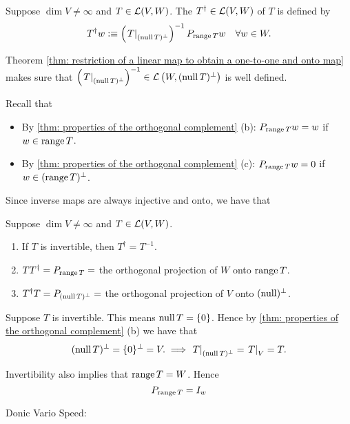 \begin{mydef}
  Suppose $\dim V \neq \infty$ and $T \in \mathcal{L}(V,W)$. The  $T^\dagger \in \mathcal{L}(V, W)$ of $T$ is defined by
  \[
    T^\dagger w :\equiv  \left( \left. T \right|_{(\operatorname{null} T)^\bot} \right)^{-1} P_{\operatorname{range} T} w \quad \forall w \in W.
  \]

  Theorem \ref{thm: restriction of a linear map to obtain a one-to-one and onto map} makes sure that $\left( \left. T \right|_{(\operatorname{null} T)^\bot} \right)^{-1} \in \mathcal{L} \left(W, (\operatorname{null} T)^\bot \right)$ is well defined.
\end{mydef}

Recall that
\begin{itemize}
  \item By \ref{thm: properties of the orthogonal complement} (b): $P_{\operatorname{range} T} w = w$ if $w \in \operatorname{range} T$.
  \item By \ref{thm: properties of the orthogonal complement} (c): $P_{\operatorname{range} T} w =0$ if $w \in (\operatorname{range} T)^\bot$.
\end{itemize}

Since inverse maps are always injective and onto, we have that

\begin{thm} 
  Suppose $\dim V \neq \infty$ and $T\in \mathcal{L}(V,W)$.
  \begin{enumerate}[label=(\alph*)]
    \item If $T$ is invertible, then $T^\dagger = T^{-1}$.
    \item $T T^\dagger = P_{\operatorname{range} T} =$ the orthogonal projection of $W$ onto $\operatorname{range} T$.
    \item $T^\dagger T = P_{(\operatorname{null} T)^\bot} =$ the orthogonal projection of $V$ onto $(\operatorname{null})^\bot$.
  \end{enumerate}
\end{thm}
\begin{prf}
  Suppose $T$ is invertible. This means $\operatorname{null} T = \{0\}$. Hence by \ref{thm: properties of the orthogonal complement} (b) we have that
  \[
    (\operatorname{null} T)^\bot = \{0\}^\bot = V. \implies \left. T \right |_{(\operatorname{null} T)^\bot} = \left. T \right|_V= T.
  \]

  Invertibility also implies that $\operatorname{range} T = W$. Hence
  \[
    P_{\operatorname{range} T} = I_w
  \]

\end{prf}

Donic Vario
Speed: